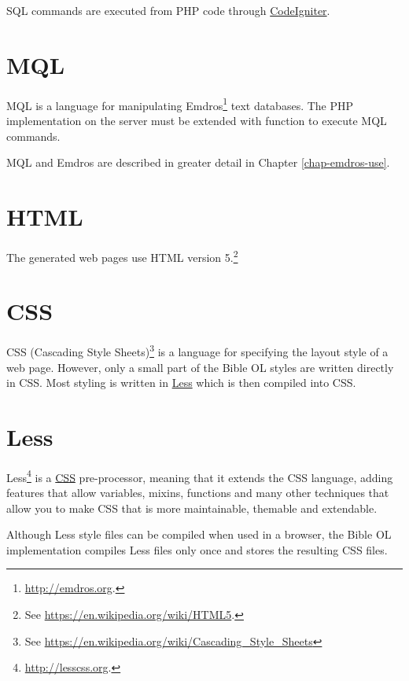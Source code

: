 \documentclass[11pt,oneside,a4paper]{memoir}
\begin{document}
SQL commands are executed from PHP code through \hyperref[sec-codeigniter]{CodeIgniter}.


\section{MQL}\label{mql}

MQL is a language for manipulating Emdros\footnote{\url{http://emdros.org}.} text databases. The PHP
implementation on the server must be extended with function to execute MQL commands.

MQL and Emdros are described in greater detail in Chapter \ref{chap-emdros-use}.



\section{HTML}

The generated web pages use HTML version 5.\footnote{See \url{https://en.wikipedia.org/wiki/HTML5}.}


\section{CSS}\label{css}

CSS (Cascading Style Sheets)\footnote{See
  \url{https://en.wikipedia.org/wiki/Cascading_Style_Sheets}} is a language for specifying the
layout style of a web page. However, only a small part of the Bible OL styles are written directly
in CSS. Most styling is written in \hyperref[less]{Less} which is then compiled into CSS.


\section{Less}\label{less}

Less\footnote{\url{http://lesscss.org}.} is a \hyperref[css]{CSS} pre-processor, meaning that it
extends the CSS language, adding features that allow variables, mixins, functions and many other
techniques that allow you to make CSS that is more maintainable, themable and extendable.

Although Less style files can be compiled when used in a browser, the Bible OL implementation
compiles Less files only once and stores the resulting CSS files.
\end{document}
